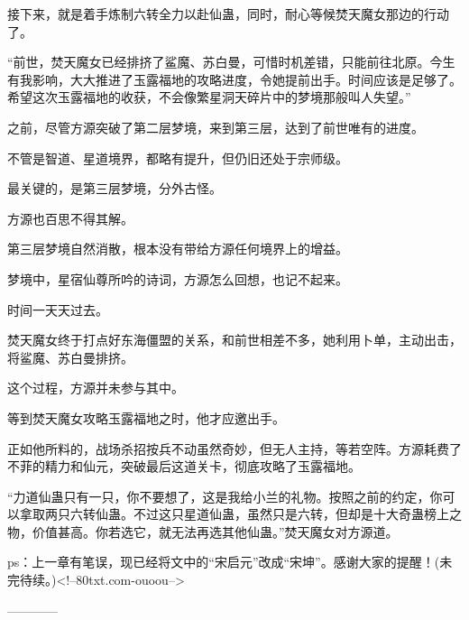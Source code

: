 \begin{this_body}
接下来，就是着手炼制六转全力以赴仙蛊，同时，耐心等候焚天魔女那边的行动了。

“前世，焚天魔女已经排挤了鲨魔、苏白曼，可惜时机差错，只能前往北原。今生有我影响，大大推进了玉露福地的攻略进度，令她提前出手。时间应该是足够了。希望这次玉露福地的收获，不会像繁星洞天碎片中的梦境那般叫人失望。”

之前，尽管方源突破了第二层梦境，来到第三层，达到了前世唯有的进度。

不管是智道、星道境界，都略有提升，但仍旧还处于宗师级。

最关键的，是第三层梦境，分外古怪。

方源也百思不得其解。

第三层梦境自然消散，根本没有带给方源任何境界上的增益。

梦境中，星宿仙尊所吟的诗词，方源怎么回想，也记不起来。

时间一天天过去。

焚天魔女终于打点好东海僵盟的关系，和前世相差不多，她利用卜单，主动出击，将鲨魔、苏白曼排挤。

这个过程，方源并未参与其中。

等到焚天魔女攻略玉露福地之时，他才应邀出手。

正如他所料的，战场杀招按兵不动虽然奇妙，但无人主持，等若空阵。方源耗费了不菲的精力和仙元，突破最后这道关卡，彻底攻略了玉露福地。

“力道仙蛊只有一只，你不要想了，这是我给小兰的礼物。按照之前的约定，你可以拿取两只六转仙蛊。不过这只星道仙蛊，虽然只是六转，但却是十大奇蛊榜上之物，价值甚高。你若选它，就无法再选其他仙蛊。”焚天魔女对方源道。

ps：上一章有笔误，现已经将文中的“宋启元”改成“宋坤”。感谢大家的提醒！(未完待续。)<!--80txt.com-ouoou-->

------------

\end{this_body}

